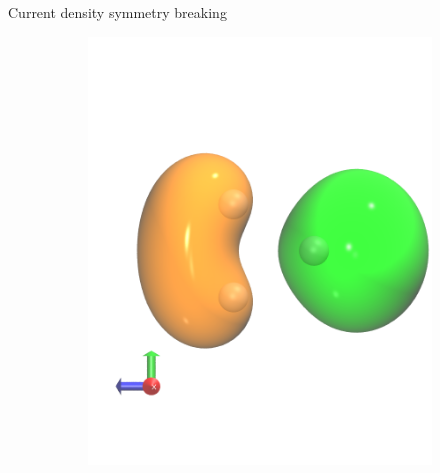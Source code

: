 \begin{frame}{Current density symmetry breaking}
\begin{itemize}
{\begin{itemize}
\begin{figure}
\begin{subfigure}{.40\textwidth}
              \includegraphics{./cursym/data/h3/b2_1200ppi.png}
            \end{subfigure}


\end{figure}
\end{itemize}}
\end{itemize}
\end{frame}
